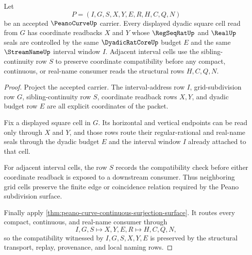 \begin{theorem}
\label{thm:peano-curve-grid-cell-compatibility}
Let
$$
P=(I,G,S,X,Y,E,R,H,C,Q,N)
$$
be an accepted $\PeanoCurveUp$ carrier. Every displayed dyadic square cell read from $G$ has coordinate readbacks $X$ and $Y$ whose $\RegSeqRatUp$ and $\RealUp$ seals are controlled by the same $\DyadicRatCoreUp$ budget $E$ and the same $\StreamNameUp$ interval window $I$. Adjacent interval cells use the sibling-continuity row $S$ to preserve coordinate compatibility before any compact, continuous, or real-name consumer reads the structural rows $H,C,Q,N$.
\end{theorem}
\begin{proof}
Project the accepted carrier. The interval-address row $I$, grid-subdivision row $G$, sibling-continuity row $S$, coordinate readback rows $X,Y$, and dyadic budget row $E$ are all explicit coordinates of the packet.

Fix a displayed square cell in $G$. Its horizontal and vertical endpoints can be read only through $X$ and $Y$, and those rows route their regular-rational and real-name seals through the dyadic budget $E$ and the interval window $I$ already attached to that cell.

For adjacent interval cells, the row $S$ records the compatibility check before either coordinate readback is exposed to a downstream consumer. Thus neighboring grid cells preserve the finite edge or coincidence relation required by the Peano subdivision surface.

Finally apply \autoref{thm:peano-curve-continuous-surjection-surface}. It routes every compact, continuous, and real-name consumer through
$$
I,G,S \longmapsto X,Y,E,R \longmapsto H,C,Q,N ,
$$
so the compatibility witnessed by $I,G,S,X,Y,E$ is preserved by the structural transport, replay, provenance, and local naming rows.
\end{proof}


